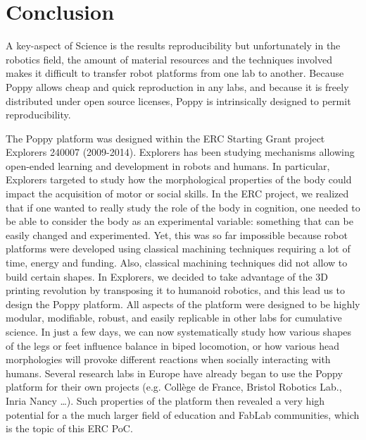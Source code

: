 
\chapter{Conclusion} %
\label{cha:conclusion}

A key-aspect of Science is the results reproducibility but unfortunately in the robotics field, the amount of material resources and the techniques involved makes it difficult to transfer robot platforms from one lab to another. Because Poppy allows cheap and quick reproduction in any labs, and because it is freely distributed under open source licenses, Poppy is intrinsically designed to permit reproducibility.

The Poppy platform was designed within the ERC Starting Grant project Explorers 240007 (2009-2014). Explorers has been studying mechanisms allowing open-ended learning and development in robots and humans. In particular, Explorers targeted to study how the morphological properties of the body could impact the acquisition of motor or social skills. In the ERC project, we realized that if one wanted to really study the role of the body in cognition, one needed to be able to consider the body as an experimental variable: something that can be easily changed and experimented. Yet, this was so far impossible because robot platforms were developed using classical machining techniques requiring a lot of time, energy and funding. Also, classical machining techniques did not allow to build certain shapes. In Explorers, we decided to take advantage of the 3D printing revolution by transposing it to humanoid robotics, and this lead us to design the Poppy platform. All aspects of the platform were designed to be highly modular, modifiable, robust, and easily replicable in other labs for cumulative science. In just a few days, we can now systematically study how various shapes of the legs or feet influence balance in biped locomotion, or how various head morphologies will provoke different reactions when socially interacting with humans. Several research labs in Europe have already began to use the Poppy platform for their own projects (e.g. Collège de France, Bristol Robotics Lab., Inria Nancy …). Such properties of the platform then revealed a very high potential for a the much larger field of education and FabLab communities, which is the topic of this ERC PoC.

